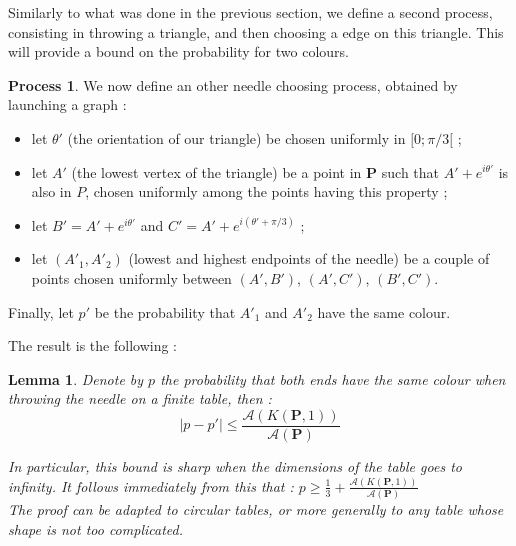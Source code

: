 \documentclass[a4paper,11pt]{article}
\newtheorem{lemma}{Lemma}
\theoremstyle{definition}
\newtheorem{process}{Process}
\theoremstyle{remark}
\begin{document}
Similarly to what was done in the previous section, we define a second process, 
consisting in throwing a triangle, and then choosing a edge on this triangle.
This will provide a bound on the probability for two colours.

\begin{process}
We now define an other needle choosing process, obtained by launching a graph :
\begin{itemize}
  \item let $\theta '$ (the orientation of our triangle) be chosen uniformly 
  in $[0;\pi / 3[$ ;
  \item let $A'$ (the lowest vertex of the triangle) be a point in $\mathbf{P}$ such 
  that $A' + e^{i\theta '}$ is also in $P$, chosen uniformly among the points 
  having this property ;
  \item let $B' = A' + e^{i \theta '}$ and $C' = A' + e^{i (\theta ' + \pi / 3 ) }$ ;
  \item let $(A'_1,A'_2)$ (lowest and highest endpoints of the needle) be a 
  couple of points chosen uniformly between $(A',B')$, $(A',C')$, $(B',C')$.
\end{itemize}
Finally, let $p'$ be the probability that $A'_1$ and $A'_2$ have the same 
colour.
\end{process}


The result is the following :
\begin{lemma}
Denote by $p$ the probability that both ends have the same colour when throwing 
the needle on a finite table, then :
 $$ | p - p'| \leq \frac{\mathcal{A}(K(\mathbf{P},1))}{\mathcal{A}(\mathbf{P})} $$

In particular, this bound is sharp when the dimensions of the table goes to 
infinity. It follows immediately from this that : $p \geq \frac13 + \frac{\mathcal{A}(K(\mathbf{P},1))}{\mathcal{A}(\mathbf{P})} $ \\
The proof can be adapted to circular tables, or more generally to any table 
whose shape is not too complicated. \\
\end{lemma}
\end{document}
